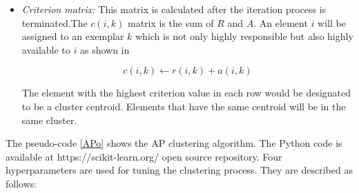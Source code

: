 \documentclass[../UNBThesis2.tex]{subfiles}
\begin{document}
\begin{itemize}
  \item\textit{Criterion matrix:} This matrix is calculated after the iteration process is terminated.The $c (i,k)$ matrix is the sum of $R$ and $A$. An element $i$ will be assigned to an exemplar $k$ which is not only highly responsible but also highly available to $i$  as shown in 
    
    \begin{equation}
        c(i, k) \leftarrow r(i, k) + a(i, k)
    \end{equation}
    
  

The element with the highest criterion value in each row would be designated to be a cluster centroid. Elements that have the same centroid will be in the same cluster.







\end{itemize}

The pseudo-code \ref{APo} shows the AP clustering algorithm. The Python code is available at https://scikit-learn.org/ open source repository. Four hyperparameters are used for tuning the clustering process. They are described as follows: 
\end{document}
